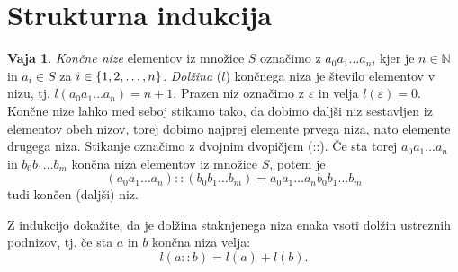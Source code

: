 \documentclass{article}
\newcommand{\NN}{\mathbb{N}}
\theoremstyle{definition}
\newtheorem{vaja}{Vaja}
\begin{document}
\section{Strukturna indukcija}
\begin{vaja}
	\emph{Končne nize} elementov iz množice $S$ označimo z $a_0 a_1 \ldots a_n$, kjer je $n \in \NN$ in $a_i \in S$ za $i\in \set{1, 2, \ldots, n}$. \emph{Dolžina} ($l$) končnega niza je število elementov v nizu, tj. $l(a_0 a_1 \ldots a_n) = n + 1$. Prazen niz označimo z $\varepsilon$ in velja $l(\varepsilon) =0$. Končne nize lahko med seboj stikamo tako, da dobimo daljši niz sestavljen iz elementov obeh nizov, torej dobimo najprej elemente prvega niza, nato elemente drugega niza. Stikanje označimo z dvojnim dvopičjem (::). Če sta torej $a_0a_1 \ldots a_n$ in $b_0 b_1 \ldots b_m$ končna niza elementov iz množice $S$, potem je $$(a_0a_1 \ldots a_n) :: (b_0 b_1 \ldots b_m) = a_0a_1 \ldots a_n b_0 b_1 \ldots b_m$$ tudi končen (daljši) niz. 
	
	Z indukcijo dokažite, da je dolžina staknjenega niza enaka vsoti dolžin ustreznih podnizov, tj.
	če sta $a$ in $b$ končna niza velja:
	$$ l(a :: b) = l(a) + l(b). $$
\end{vaja}
\end{document}
